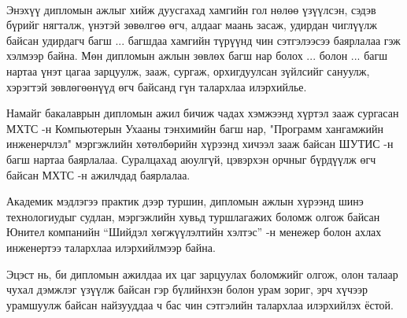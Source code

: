 
\begin{acknowledgements}
\addchaptertocentry{\acknowledgementname}

\paragraph{} Энэхүү дипломын ажлыг хийж дуусгахад хамгийн гол нөлөө үзүүлсэн, сэдэв бүрийг нягталж,  үнэтэй зөвөлгөө өгч,  алдааг маань засаж, удирдан чиглүүлж байсан удирдагч багш ... багшдаа хамгийн түрүүнд чин сэтгэлээсээ баярлалаа гэж хэлмээр байна. Мөн дипломын ажлын зөвлөх багш нар болох ... болон ... багш нартаа үнэт цагаа зарцуулж, зааж, сургаж, орхигдуулсан зүйлсийг сануулж, хэрэгтэй зөвлөгөөнүүд өгч байсанд гүн талархлаа илэрхийлье.
\newline
\newline
\par Намайг бакалаврын дипломын ажил бичиж чадах хэмжээнд хүртэл зааж сургасан МХТС -н Компьютерын Ухааны тэнхимийн багш нар, "Программ хангамжийн инженерчлэл" мэргэжлийн хөтөлбөрийн хүрээнд хичээл зааж байсан ШУТИС -н багш нартаа баярлалаа. Суралцахад аюулгүй, цэвэрхэн орчныг бүрдүүлж өгч байсан МХТС -н ажилчдад баярлалаа.
\newline
\newline
\par Академик мэдлэгээ практик дээр туршин, дипломын ажлын хүрээнд шинэ технологиудыг судлан, мэргэжлийн хувьд туршлагажих боломж олгож байсан Юнител компанийн “Шийдэл хөгжүүлэлтийн хэлтэс” -н менежер болон ахлах инженертээ талархлаа илэрхийлмээр байна.
\newline
\newline
\par Эцэст нь, би дипломын ажилдаа их цаг зарцуулах боломжийг олгож, олон талаар чухал дэмжлэг үзүүлж байсан гэр бүлийнхэн болон урам зориг, эрч хүчээр урамшуулж байсан найзууддаа ч бас чин сэтгэлийн талархлаа илэрхийлэх ёстой.


\end{acknowledgements}